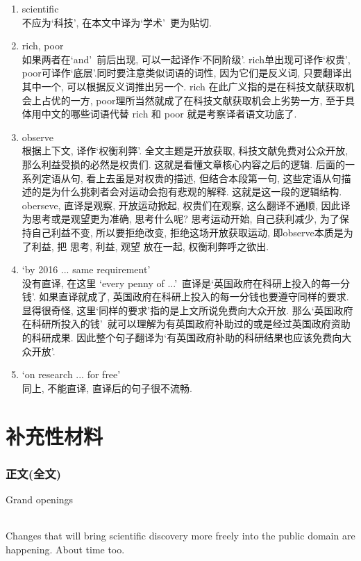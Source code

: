 \documentclass[a4paper, 12pt, UTF8]{article}
\begin{document}
\begin{enumerate}[\hspace{0.5cm} 1.]
    \item scientific \\
          不应为\lq 科技\rq, 在本文中译为\lq 学术\rq\ 更为贴切.
    \item rich, poor\\
          如果两者在\lq and\rq\ 前后出现, 可以一起译作\lq 不同阶级\rq. rich单出现可译作\lq 权贵\rq, poor可译作\lq 底层\rq.同时要注意类似词语的词性, 因为它们是反义词, 只要翻译出其中一个, 可以根据反义词推出另一个. rich 在此广义指的是在科技文献获取机会上占优的一方, poor理所当然就成了在科技文献获取机会上劣势一方, 至于具体用中文的哪些词语代替 rich 和 poor 就是考察译者语文功底了.
    \item observe\\
          根据上下文, 译作\lq 权衡利弊\rq. 全文主题是开放获取, 科技文献免费对公众开放, 那么利益受损的必然是权贵们. 这就是看懂文章核心内容之后的逻辑. 后面的一系列定语从句, 看上去虽是对权贵的描述, 但结合本段第一句, 这些定语从句描述的是为什么挑刺者会对运动会抱有悲观的解释. 这就是这一段的逻辑结构. oberseve, 直译是观察, 开放运动掀起, 权贵们在观察, 这么翻译不通顺, 因此译为思考或是观望更为准确, 思考什么呢? 思考运动开始, 自己获利减少, 为了保持自己利益不变, 所以要拒绝改变, 拒绝这场开放获取运动, 即observe本质是为了利益, 把 思考, 利益, 观望 放在一起, 权衡利弊呼之欲出.
    \item \lq by 2016 ... same requirement\rq \\
          没有直译, 在这里 \lq every penny of ...\rq\ 直译是\lq 英国政府在科研上投入的每一分钱\rq. 如果直译就成了, 英国政府在科研上投入的每一分钱也要遵守同样的要求. 显得很奇怪, 这里\lq 同样的要求\rq 指的是上文所说免费向大众开放. 那么\lq 英国政府在科研所投入的钱\rq\ 就可以理解为有英国政府补助过的或是经过英国政府资助的科研成果. 因此整个句子翻译为\lq 有英国政府补助的科研结果也应该免费向大众开放\rq. 
    \item \lq on research ... for free\rq \\
          同上, 不能直译, 直译后的句子很不流畅.
\end{enumerate}

\newpage
\part{补充性材料}

\newpage
\section{正文(全文)}
\begin{bfseries}
    \Large
    Grand openings
    \paragraph*{}
    \large
    Changes that will bring scientific discovery more freely into the public domain are happening. About time too.
\end{bfseries}
\end{document}
